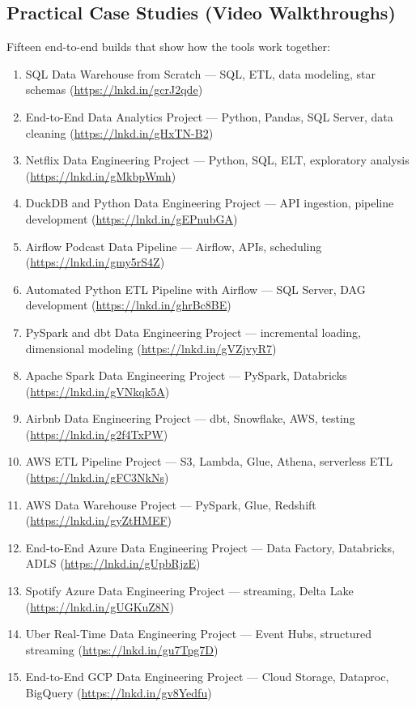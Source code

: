 \subsection*{Practical Case Studies (Video Walkthroughs)}
Fifteen end-to-end builds that show how the tools work together:
\begin{enumerate}
    \item SQL Data Warehouse from Scratch --- SQL, ETL, data modeling, star schemas (\url{https://lnkd.in/gcrJ2qde})
    \item End-to-End Data Analytics Project --- Python, Pandas, SQL Server, data cleaning (\url{https://lnkd.in/gHxTN-B2})
    \item Netflix Data Engineering Project --- Python, SQL, ELT, exploratory analysis (\url{https://lnkd.in/gMkbpWmh})
    \item DuckDB and Python Data Engineering Project --- API ingestion, pipeline development (\url{https://lnkd.in/gEPnubGA})
    \item Airflow Podcast Data Pipeline --- Airflow, APIs, scheduling (\url{https://lnkd.in/gmy5rS4Z})
    \item Automated Python ETL Pipeline with Airflow --- SQL Server, DAG development (\url{https://lnkd.in/ghrBc8BE})
    \item PySpark and dbt Data Engineering Project --- incremental loading, dimensional modeling (\url{https://lnkd.in/gVZjvyR7})
    \item Apache Spark Data Engineering Project --- PySpark, Databricks (\url{https://lnkd.in/gVNkqk5A})
    \item Airbnb Data Engineering Project --- dbt, Snowflake, AWS, testing (\url{https://lnkd.in/g2f4TxPW})
    \item AWS ETL Pipeline Project --- S3, Lambda, Glue, Athena, serverless ETL (\url{https://lnkd.in/gFC3NkNs})
    \item AWS Data Warehouse Project --- PySpark, Glue, Redshift (\url{https://lnkd.in/gyZtHMEF})
    \item End-to-End Azure Data Engineering Project --- Data Factory, Databricks, ADLS (\url{https://lnkd.in/gUpbRjzE})
    \item Spotify Azure Data Engineering Project --- streaming, Delta Lake (\url{https://lnkd.in/gUGKuZ8N})
    \item Uber Real-Time Data Engineering Project --- Event Hubs, structured streaming (\url{https://lnkd.in/gu7Tpg7D})
    \item End-to-End GCP Data Engineering Project --- Cloud Storage, Dataproc, BigQuery (\url{https://lnkd.in/gv8Yedfu})
\end{enumerate}

